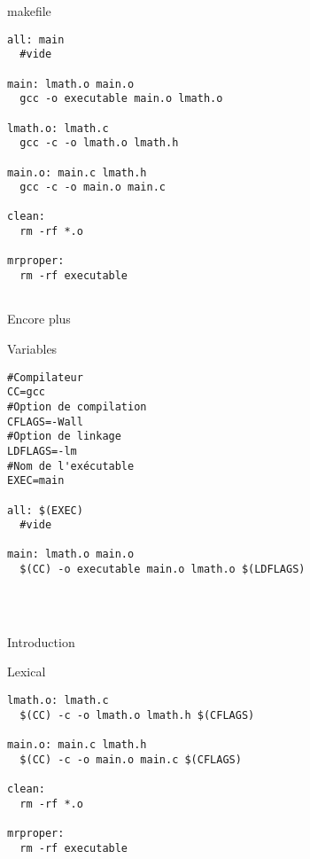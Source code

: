 \begin{frame}[containsverbatim]{\ftitle}
\def\blocktitle{makefile}
\begin{block}{\blocktitle}
\begin{verbatim}
all: main
  #vide
  
main: lmath.o main.o
  gcc -o executable main.o lmath.o
  
lmath.o: lmath.c
  gcc -c -o lmath.o lmath.h
  
main.o: main.c lmath.h
  gcc -c -o main.o main.c

clean:
  rm -rf *.o
  
mrproper:
  rm -rf executable
 
\end{verbatim}
\end{block}
\end{frame}



\def\ftitle{Encore plus}
\begin{frame}[containsverbatim]{\ftitle}
\def\blocktitle{Variables}
\begin{block}{\blocktitle}
\begin{verbatim}
#Compilateur
CC=gcc
#Option de compilation
CFLAGS=-Wall
#Option de linkage
LDFLAGS=-lm
#Nom de l'exécutable
EXEC=main

all: $(EXEC)
  #vide
  
main: lmath.o main.o
  $(CC) -o executable main.o lmath.o $(LDFLAGS)
  

 
\end{verbatim}%
\end{block}
\end{frame}


\def\ftitle{Introduction}
\begin{frame}[containsverbatim]{\ftitle}
\def\blocktitle{Lexical}
\begin{block}{\blocktitle}
\begin{verbatim}
lmath.o: lmath.c
  $(CC) -c -o lmath.o lmath.h $(CFLAGS)
  
main.o: main.c lmath.h
  $(CC) -c -o main.o main.c $(CFLAGS)

clean:
  rm -rf *.o
  
mrproper:
  rm -rf executable
\end{verbatim}
\end{block}
\end{frame}

